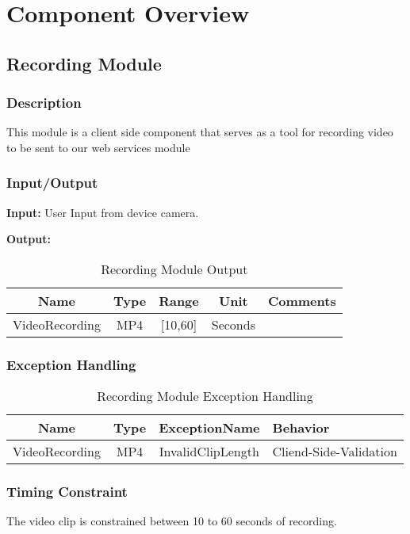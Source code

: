 \documentclass{article}
\begin{document}
\section{Component Overview}

\subsection{Recording Module}
\subsubsection{Description}
This module is a client side component that serves as a tool for recording video to be sent to our web services module

\subsubsection{Input/Output}
\textbf{Input:} User Input from device camera.

\textbf{Output:}
\begin{table}[H]
    \caption{Recording Module Output}
    \centering
    \begin{tabularx}{0.7\textwidth}{|c|c|c|c|X|} \hline
        \textbf{Name} & \textbf{Type} & \textbf{Range} & \textbf{Unit} & \textbf{Comments} \\ \hline
        VideoRecording & MP4 & [10,60] & Seconds & \\ \hline
    \end{tabularx}
    \label{tab:Recording_Output}
\end{table}

\subsubsection{Exception Handling}
\begin{table}[H]
    \caption{Recording Module Exception Handling}
    \centering
    \begin{tabularx}{0.7\textwidth}{|c|c|c|X|} \hline
        \textbf{Name} & \textbf{Type} & \textbf{ExceptionName} & \textbf{Behavior} \\ \hline
        VideoRecording & MP4 & InvalidClipLength & Cliend-Side-Validation \\ \hline
    \end{tabularx}
    \label{tab:Recording_Exception}
\end{table}

\subsubsection{Timing Constraint}
The video clip is constrained between 10 to 60 seconds of recording.
\end{document}
